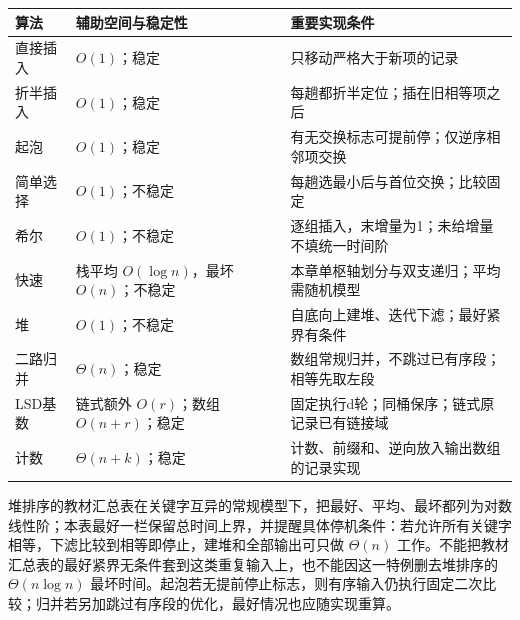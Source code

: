 \begin{wideblock}

\par\medskip\noindent\begin{minipage}{\linewidth}\fontsize{9.3}{12}\selectfont\begin{tabularx}{\linewidth}{@{}YYY@{}}
\toprule\noalign{}
\begin{minipage}[b]{\linewidth}\raggedright
算法
\end{minipage} & \begin{minipage}[b]{\linewidth}\raggedright
辅助空间与稳定性
\end{minipage} & \begin{minipage}[b]{\linewidth}\raggedright
重要实现条件
\end{minipage} \\
\midrule\noalign{}


直接插入 & \(O(1)\)；稳定 & 只移动严格大于新项的记录 \\
折半插入 & \(O(1)\)；稳定 & 每趟都折半定位；插在旧相等项之后 \\
起泡 & \(O(1)\)；稳定 & 有无交换标志可提前停；仅逆序相邻项交换 \\
简单选择 & \(O(1)\)；不稳定 & 每趟选最小后与首位交换；比较固定 \\
希尔 & \(O(1)\)；不稳定 & 逐组插入，末增量为1；未给增量不填统一时间阶 \\
快速 & 栈平均 \(O(\log n)\)，最坏 \(O(n)\)；不稳定 & 本章单枢轴划分与双支递归；平均需随机模型 \\
堆 & \(O(1)\)；不稳定 & 自底向上建堆、迭代下滤；最好紧界有条件 \\
二路归并 & \(\Theta(n)\)；稳定 & 数组常规归并，不跳过已有序段；相等先取左段 \\
LSD基数 & 链式额外 \(O(r)\)；数组 \(O(n+r)\)；稳定 & 固定执行d轮；同桶保序；链式原记录已有链接域 \\
计数 & \(\Theta(n+k)\)；稳定 & 计数、前缀和、逆向放入输出数组的记录实现 \\
\bottomrule\end{tabularx}
\end{minipage}\par\medskip

\end{wideblock}

堆排序的教材汇总表在关键字互异的常规模型下，把最好、平均、最坏都列为对数线性阶；本表最好一栏保留总时间上界，并提醒具体停机条件：若允许所有关键字相等，下滤比较到相等即停止，建堆和全部输出可只做 \(\Theta(n)\) 工作。不能把教材汇总表的最好紧界无条件套到这类重复输入上，也不能因这一特例删去堆排序的 \(\Theta(n\log n)\) 最坏时间。起泡若无提前停止标志，则有序输入仍执行固定二次比较；归并若另加跳过有序段的优化，最好情况也应随实现重算。


